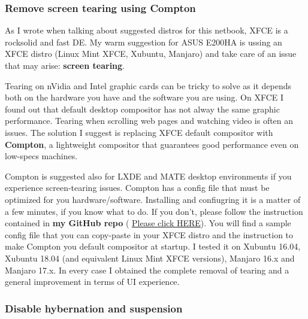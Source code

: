 \documentclass{article}
\begin{document}
\subsubsection{Remove screen tearing using Compton}
As I wrote when talking about suggested distros for this netbook, XFCE is a rocksolid and fast DE. My warm suggestion for ASUS E200HA is ussing an XFCE distro (Linux Mint XFCE, Xubuntu, Manjaro) and take care of an issue that may arise: \textbf{screen tearing}. 

Tearing on nVidia and Intel graphic cards can be tricky to solve as it depends both on the hardware you have and the software you are using. On XFCE I found out that default desktop compositor has not alway the same graphic performance. Tearing when scrolling web pages and watching video is often an issues. The solution I suggest is replacing XFCE default compositor with \textbf{Compton}, a lightweight compositor that guarantees good performance even on low-specs machines. 

Compton is suggested also for LXDE and MATE desktop environments if you experience screen-tearing issues. Compton has a config file that must be optimized for you hardware/software. Installing and confiugring it is a matter of a few minutes, if you know what to do. If you don't, please follow the instruction contained in \textbf{my GitHub repo} ( \href{https://github.com/matteobonanomi/comptonnotearing}{Please click HERE}). You will find a sample config file that you can copy-paste in your XFCE distro and the instruction to make Compton you default compositor at startup. I tested it on Xubuntu 16.04, Xubuntu 18.04 (and equivalent Linux Mint XFCE versions), Manjaro 16.x and Manjaro 17.x. In every case I obtained the complete removal of tearing and a general improvement in terms of UI experience.

\subsubsection{Disable hybernation and suspension}
\end{document}
